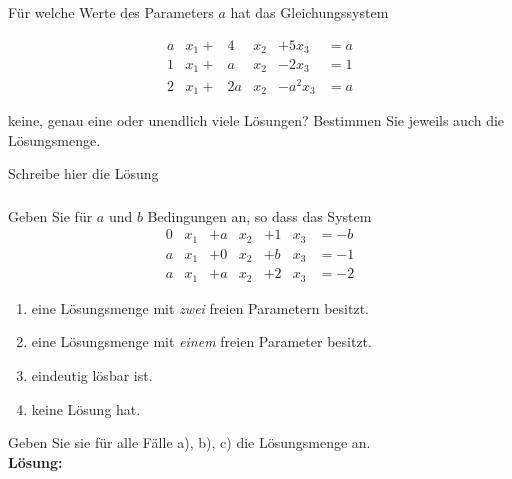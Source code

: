 \subsubsection{}  %
Für welche Werte des Parameters \( a \) hat das Gleichungssystem

\begin{equation*}
    \begin{aligned}
        a&x_1 +& 4&x_2 &+ 5x_3 &= a\\
        1&x_1 +& a&x_2 &- 2x_3 &= 1\\
        2&x_1 +& 2a&x_2 &- a^2x_3 &= a
    \end{aligned}   
\end{equation*}

keine, genau eine oder unendlich viele Lösungen? Bestimmen Sie jeweils auch die Lösungsmenge.

\vspace{1\baselineskip}

\begin{solution}

    \vspace{1\baselineskip}

    Schreibe hier die Lösung

\end{solution}

\newpage

\subsubsection{} %
Geben Sie für \( a \) und \( b \) Bedingungen an, so dass das System
\begin{equation*}
    \begin{aligned}
        0 &x_1 &+ a &x_2 &+ 1 &x_3 &= -b\\
        a &x_1 &+ 0 &x_2 &+ b &x_3 &= -1\\
        a &x_1 &+ a &x_2 &+ 2 &x_3 &= -2
    \end{aligned}
\end{equation*}

\begin{enumerate}[label=\alph*)]
    \item eine Lösungsmenge mit \textit{zwei} freien Parametern besitzt.
    \item eine Lösungsmenge mit \textit{einem} freien Parameter besitzt.
    \item eindeutig lösbar ist.
    \item keine Lösung hat.
\end{enumerate}

Geben Sie sie für alle Fälle a), b), c) die Lösungsmenge an.\\

\noindent \textbf{Lösung:}